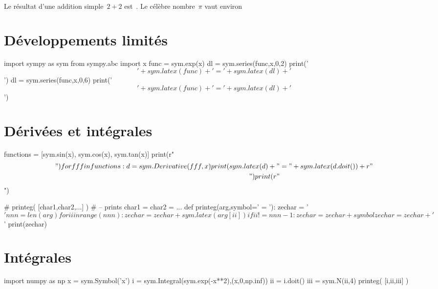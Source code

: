 \documentclass[12pt]{scrartcl}
\begin{document}
Le résultat d'une addition simple~$2+2$ est~. Le célèbre nombre~$\pi$ vaut environ  

\section{Développements limités}

\begin{pyblock}
import sympy as sym
from sympy.abc import x
func = sym.exp(x)
dl = sym.series(func,x,0,2)
print('\['+sym.latex(func)+'='+sym.latex(dl)+'\]')
dl = sym.series(func,x,0,6)
print('\['+sym.latex(func)+'='+sym.latex(dl)+'\]')
\end{pyblock}
\printpythontex

\section{Dérivées et intégrales}

\begin{pyblock}[][fontsize=\footnotesize]
functions = [sym.sin(x), sym.cos(x), sym.tan(x)]
print(r"\begin{align*}")
for fff in functions:
 d = sym.Derivative(fff, x)
 print(sym.latex(d) + "&=" + sym.latex(d.doit()) + r"\\")
print(r"\end{align*}")
\end{pyblock}
\printpythontex

\begin{pycode}
# printeg( [char1,char2,...] )
# -- prints char1 = char2 = ...
def printeg(arg,symbol=' = '):
  zechar = '\[ '
  nnn = len(arg)
  for ii in range(nnn):
    zechar = zechar + sym.latex(arg[ii])
    if ii != nnn-1:
      zechar = zechar + symbol
  zechar = zechar + ' \]'
  print(zechar)
\end{pycode}

\section{Intégrales}
\begin{pyblock}
import numpy as np
x = sym.Symbol('x')
i = sym.Integral(sym.exp(-x**2),(x,0,np.inf))
ii = i.doit()
iii = sym.N(ii,4)
printeg( [i,ii,iii] )
\end{pyblock}
\printpythontex

\end{document}
